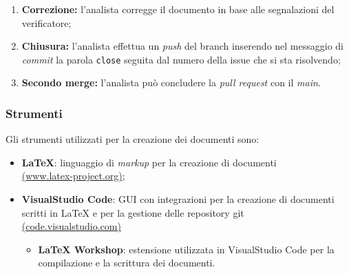 \begin{itemize}
\begin{enumerate}
		      \item \textbf{Correzione:} l'analista corregge il documento
		            in base alle segnalazioni del verificatore;

		      \item \textbf{Chiusura:} l'analista effettua un \textit{push} del
		            branch inserendo nel messaggio di \textit{commit} la parola
		            \texttt{close} seguita dal numero della issue che si sta
		            risolvendo;

		      \item \textbf{Secondo merge:} l'analista può concludere la
		            \textit{pull request} con il \textit{main}.
	      \end{enumerate}
\end{itemize}

\subsubsection{Strumenti}
Gli strumenti utilizzati per la creazione dei documenti sono:
\begin{itemize}
	\item \textbf{LaTeX}: linguaggio di \textit{markup} per la creazione di documenti \\
	      \href{https://www.latex-project.org/}{(www.latex-project.org)};
	\item \textbf{VisualStudio Code}: GUI con integrazioni per la creazione di documenti scritti in LaTeX e per la gestione delle repository git \\
	      \href{https://code.visualstudio.com/}{(code.visualstudio.com)}
	      \begin{itemize}
		      \item \textbf{LaTeX Workshop}: estensione utilizzata in VisualStudio Code per la compilazione e la scrittura dei documenti.
	      \end{itemize}
\end{itemize}

